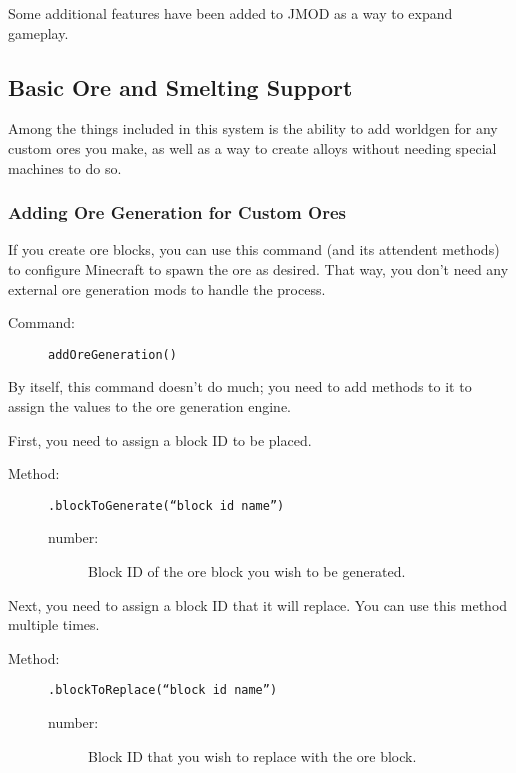 \documentclass[letterpaper,titlepage,12pt]{article}
\begin{document}
Some additional features have been added to JMOD as a way to expand gameplay.

\subsection{Basic Ore and Smelting Support}

Among the things included in this system is the ability to add worldgen for any custom ores you make, as well as a way to create alloys without needing special machines to do so.

\subsubsection{Adding Ore Generation for Custom Ores}

If you create ore blocks, you can use this command (and its attendent methods) to configure Minecraft to spawn the ore as desired.  That way, you don't need any external ore generation mods to handle the process.

\begin{description}
\item[Command:] \texttt{addOreGeneration()}
\end{description}

By itself, this command doesn't do much; you need to add methods to it to assign the values to the ore generation engine.

First, you need to assign a block ID to be placed.

\begin{description}
\item[Method:] \texttt{.blockToGenerate(``block id name'')}
\begin{description}
\item [number:] Block ID of the ore block you wish to be generated.
\end{description}
\end{description}

Next, you need to assign a block ID that it will replace.  You can use this method multiple times.

\begin{description}
\item[Method:] \texttt{.blockToReplace(``block id name'')}
\begin{description}
\item [number:] Block ID that you wish to replace with the ore block.
\end{description}
\end{description}
\end{document}
